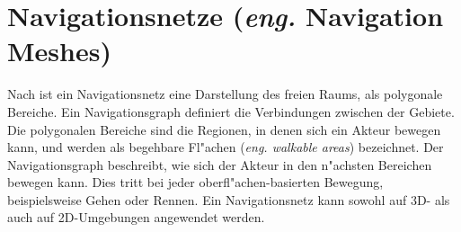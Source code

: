 \section{Navigationsnetze (\textit{eng.} Navigation Meshes)}
%
Nach \cite{Mesh:16} ist ein Navigationsnetz eine Darstellung des freien Raums, als polygonale Bereiche. Ein Navigationsgraph definiert die Verbindungen zwischen der Gebiete. Die polygonalen Bereiche sind die Regionen, in denen sich ein Akteur bewegen kann, und werden als begehbare Fl"achen (\textit{eng. walkable areas}) bezeichnet. Der Navigationsgraph beschreibt, wie sich der Akteur in den n"achsten Bereichen bewegen kann. Dies tritt bei jeder oberfl"achen-basierten Bewegung, beispielsweise Gehen oder Rennen. Ein Navigationsnetz kann sowohl auf 3D- als auch auf 2D-Umgebungen angewendet werden.

